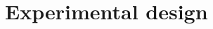 \documentclass[10pt,twocolumn,letterpaper]{article}
\begin{document}
\section{Experimental design} \label{sec:exp_design}
\end{document}
